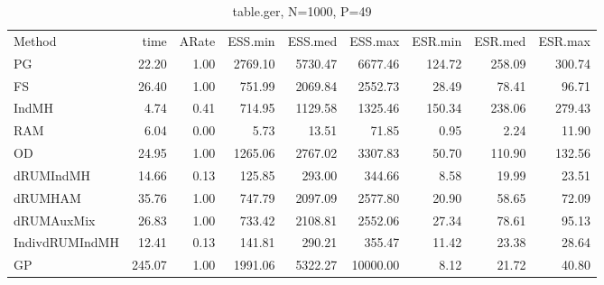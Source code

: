 \begin{table}
\begin{tabular}{l r r r r r r r r } 
          Method  &     time &    ARate &  ESS.min &  ESS.med &  ESS.max &  ESR.min &  ESR.med &  ESR.max \\ 
              PG  &    22.20 &     1.00 &  2769.10 &  5730.47 &  6677.46 &   124.72 &   258.09 &   300.74 \\ 
              FS  &    26.40 &     1.00 &   751.99 &  2069.84 &  2552.73 &    28.49 &    78.41 &    96.71 \\ 
           IndMH  &     4.74 &     0.41 &   714.95 &  1129.58 &  1325.46 &   150.34 &   238.06 &   279.43 \\ 
             RAM  &     6.04 &     0.00 &     5.73 &    13.51 &    71.85 &     0.95 &     2.24 &    11.90 \\ 
              OD  &    24.95 &     1.00 &  1265.06 &  2767.02 &  3307.83 &    50.70 &   110.90 &   132.56 \\ 
       dRUMIndMH  &    14.66 &     0.13 &   125.85 &   293.00 &   344.66 &     8.58 &    19.99 &    23.51 \\ 
         dRUMHAM  &    35.76 &     1.00 &   747.79 &  2097.09 &  2577.80 &    20.90 &    58.65 &    72.09 \\ 
      dRUMAuxMix  &    26.83 &     1.00 &   733.42 &  2108.81 &  2552.06 &    27.34 &    78.61 &    95.13 \\ 
  IndivdRUMIndMH  &    12.41 &     0.13 &   141.81 &   290.21 &   355.47 &    11.42 &    23.38 &    28.64 \\ 
              GP  &   245.07 &     1.00 &  1991.06 &  5322.27 & 10000.00 &     8.12 &    21.72 &    40.80
 \end{tabular}
\caption{table.ger, N=1000, P=49}
\end{table}

